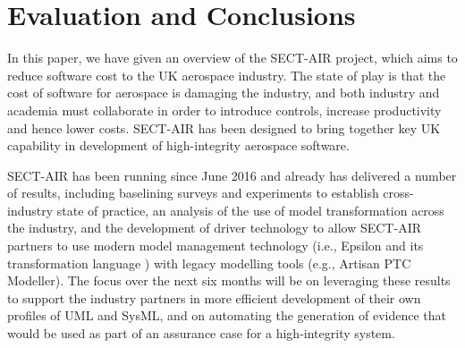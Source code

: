 \section{Evaluation and Conclusions}
\label{sec:conclusions}

In this paper, we have given an overview of the SECT-AIR project, which aims to reduce software cost to the UK aerospace industry. The state of play is that the cost of software for aerospace is damaging the industry, and both industry and academia must collaborate in order to introduce controls, increase productivity and hence lower costs. SECT-AIR has been designed to bring together key UK capability in development of high-integrity aerospace software.

SECT-AIR has been running since June 2016 and already has delivered a number of results, including baselining surveys and experiments to establish cross-industry state of practice, an analysis of the use of model transformation across the industry, and the development of driver technology to allow SECT-AIR partners to use modern model management technology (i.e., Epsilon and its transformation language \cite{Kolovos2008}) with legacy modelling tools (e.g., Artisan PTC Modeller). The focus over the next six months will be on leveraging these results to support the industry partners in more efficient development of their own profiles of UML and SysML, and on automating the generation of evidence that would be used as part of an assurance case for a high-integrity system.

